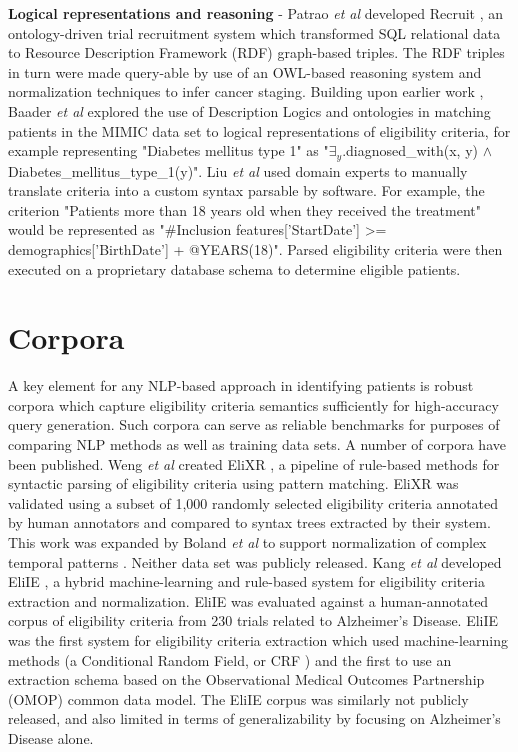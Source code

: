 \documentclass[../main.tex]{subfiles}
\begin{document}
\textbf{Logical representations and reasoning} - Patrao \textit{et al} developed Recruit \cite{patrao2015recruit}, an ontology-driven trial recruitment system which transformed SQL relational data to Resource Description Framework (RDF) graph-based triples. The RDF triples in turn were made query-able by use of an OWL-based reasoning system \cite{owl} and normalization techniques to infer cancer staging. Building upon earlier work \cite{patel2007matching, tu2009ergo, huang2013semanticct}, Baader \textit{et al} \cite{baader2018patient} explored the use of Description Logics and ontologies in matching patients in the MIMIC data set to logical representations of eligibility criteria, for example representing "Diabetes mellitus type 1" as "$\exists_y$.diagnosed\_with(x, y) $\wedge$ Diabetes\_mellitus\_type\_1(y)". Liu \textit{et al} \cite{liu2021evaluating} used domain experts to manually translate criteria into a custom syntax parsable by software. For example, the criterion "Patients more than 18 years old when they received the treatment" would be represented as "\#Inclusion features['StartDate'] >= demographics['BirthDate'] + @YEARS(18)". Parsed eligibility criteria were then executed on a proprietary database schema to determine eligible patients.

\section{Corpora}

A key element for any NLP-based approach in identifying patients is robust corpora which capture eligibility criteria semantics sufficiently for high-accuracy query generation. Such corpora can serve as reliable benchmarks for purposes of comparing NLP methods as well as training data sets. A number of corpora have been published. Weng \textit{et al} created EliXR \cite{weng2011elixr}, a pipeline of rule-based methods for syntactic parsing of eligibility criteria using pattern matching. EliXR was validated using a subset of 1,000 randomly selected eligibility criteria annotated by human annotators and compared to syntax trees extracted by their system. This work was expanded by Boland \textit{et al} to support normalization of complex temporal patterns \cite{boland2012elixrtime}. Neither data set was publicly released. Kang \textit{et al} developed EliIE \cite{kang2017eliie}, a hybrid machine-learning and rule-based system for eligibility criteria extraction and normalization. EliIE was evaluated against a human-annotated corpus of eligibility criteria from 230 trials related to Alzheimer's Disease. EliIE was the first system for eligibility criteria extraction which used machine-learning methods (a Conditional Random Field, or CRF \cite{sutton2012introduction}) and the first to use an extraction schema based on the Observational Medical Outcomes Partnership (OMOP) \cite{hripcsak2015observational} common data model. The EliIE corpus was similarly not publicly released, and also limited in terms of generalizability by focusing on Alzheimer's Disease alone. 
\end{document}
